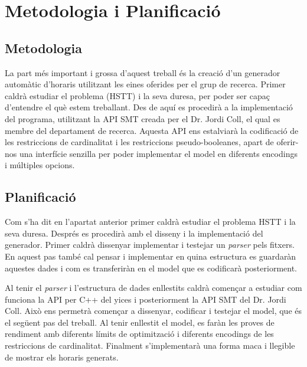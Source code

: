 \documentclass[11pt,a4paper,twoside]{report}
\begin{document}

  \chapter{Metodologia i Planificació}
  \section{Metodologia}
  La part més important i grossa d'aquest treball és la creació d'un generador automàtic d'horaris utilitzant les eines oferides per el grup de recerca. 
  Primer caldrà estudiar el problema (HSTT) i la seva duresa, per poder ser capaç d'entendre el què estem treballant.
  Des de aquí es procedirà a la implementació del programa, utilitzant la API SMT creada per el Dr. Jordi Coll, el qual es membre del departament de recerca.
  Aquesta API ens estalviarà la codificació de les restriccions de cardinalitat i les restriccions pseudo-booleanes, 
  apart de oferir-nos una interfície senzilla per poder implementar el model en diferents encodings i múltiples opcions.

  \section{Planificació}

  Com s'ha dit en l'apartat anterior primer caldrà estudiar el problema HSTT i la seva duresa. 
  Després es procedirà amb el disseny i la implementació del generador. Primer caldrà dissenyar implementar i testejar un \textit{parser} pels fitxers. En aquest pas també cal pensar i implementar en quina estructura es guardaràn aquestes dades i com es transferiràn en el model que es codificarà posteriorment. 

  Al tenir el \textit{parser} i l'estructura de dades enllestits caldrà començar a estudiar com funciona la API per C++ del yices i 
  posteriorment la API SMT del Dr. Jordi Coll. Això ens permetrà començar a dissenyar, codificar i testejar el model, que és el següent pas del treball. 
  Al tenir enllestit el model, es faràn les proves de rendiment amb diferents límits de optimització i diferents encodings de les restriccions de cardinalitat.
  Finalment s'implementarà una forma maca i llegible de mostrar els horaris generats.
  
\end{document}

